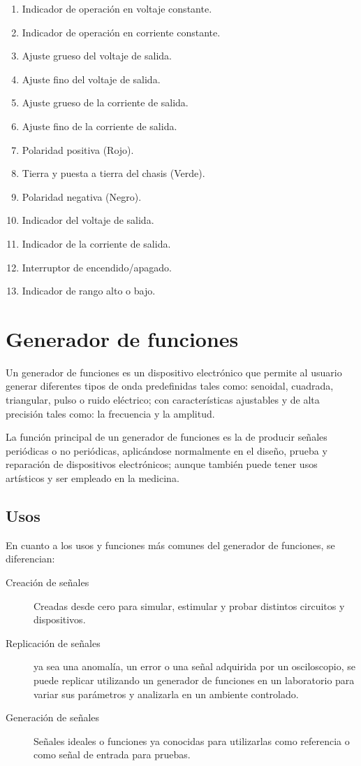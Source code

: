 \documentclass[letter,twoside,11pt]{article}
\begin{document}
\begin{enumerate}
    \item Indicador de operación en voltaje constante.
    \item Indicador de operación en corriente constante.
    \item Ajuste grueso del voltaje de salida.
    \item Ajuste fino del voltaje de salida.
    \item Ajuste grueso de la corriente de salida.
    \item Ajuste fino de la corriente de salida.
    \item Polaridad positiva (Rojo).
    \item Tierra y puesta a tierra del chasis (Verde).
    \item Polaridad negativa (Negro).
    \item Indicador del voltaje de salida.
    \item Indicador de la corriente de salida.
        \setcounter{enumi}{12}
    \item Interruptor de encendido/apagado.
    \item Indicador de rango alto o bajo.
\end{enumerate}

\section{Generador de funciones}
Un generador de funciones es un dispositivo electrónico que permite al usuario
generar diferentes tipos de onda predefinidas tales como: senoidal, cuadrada,
triangular, pulso o ruido eléctrico; con características ajustables y de alta
precisión tales como: la frecuencia y la amplitud.

La función principal de un generador de funciones es la de producir señales
periódicas o no periódicas, aplicándose normalmente en el diseño, prueba y
reparación de dispositivos electrónicos; aunque también puede tener usos
artísticos y ser empleado en la medicina.

\subsection{Usos}
En cuanto a los usos y funciones más comunes del generador de funciones, se
diferencian:

\begin{description}
    \item [Creación de señales] Creadas desde cero para simular, estimular y
    probar distintos circuitos y dispositivos.
    \item [Replicación de señales] ya sea una anomalía, un error o una señal
    adquirida por un osciloscopio, se puede replicar utilizando un generador de
    funciones en un laboratorio para variar sus parámetros y analizarla en un
    ambiente controlado.
    \item [Generación de señales] Señales ideales o funciones ya conocidas para
    utilizarlas como referencia o como señal de entrada para pruebas.
\end{description}
\end{document}
